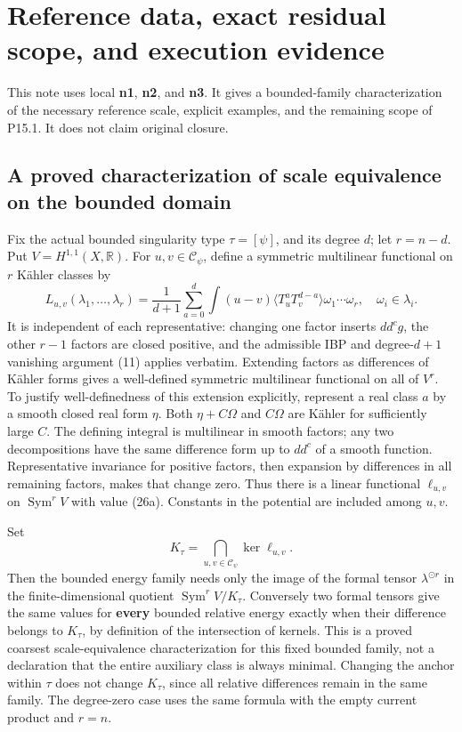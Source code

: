 \documentclass[
  11pt,
]{article}
\begin{document}
\section{Reference data, exact residual scope, and execution
evidence}\label{reference-data-exact-residual-scope-and-execution-evidence}

This note uses local \textbf{n1}, \textbf{n2}, and \textbf{n3}. It gives
a bounded-family characterization of the necessary reference scale,
explicit examples, and the remaining scope of P15.1. It does not claim
original closure.

\subsection{A proved characterization of scale equivalence on the
bounded
domain}\label{a-proved-characterization-of-scale-equivalence-on-the-bounded-domain}

Fix the actual bounded singularity type \(\tau=[\psi]\), and its degree
\(d\); let \(r=n-d\). Put \(V=H^{1,1}(X,\mathbb{R})\). For
\(u,v\in\mathcal{C}_\psi\), define a symmetric multilinear functional on
\(r\) Kähler classes by \[
L_{u,v}(\lambda_1,\ldots,\lambda_r)
=\frac1{d+1}\sum_{a=0}^d\int(u-v)
\langle T_u^aT_v^{d-a}\rangle\omega_1\cdots\omega_r,
\quad\omega_i\in\lambda_i.
\tag{26a}
\] It is independent of each representative: changing one factor inserts
\(dd^cg\), the other \(r-1\) factors are closed positive, and the
admissible IBP and degree-\(d+1\) vanishing argument (11) applies
verbatim. Extending factors as differences of Kähler forms gives a
well-defined symmetric multilinear functional on all of \(V^r\). To
justify well-definedness of this extension explicitly, represent a real
class \(a\) by a smooth closed real form \(\eta\). Both \(\eta+C\Omega\)
and \(C\Omega\) are Kähler for sufficiently large \(C\). The defining
integral is multilinear in smooth factors; any two decompositions have
the same difference form up to \(dd^c\) of a smooth function.
Representative invariance for positive factors, then expansion by
differences in all remaining factors, makes that change zero. Thus there
is a linear functional \(\ell_{u,v}\) on \(\operatorname{Sym}^rV\) with
value (26a). Constants in the potential are included among \(u,v\).

Set \[
K_\tau=\bigcap_{u,v\in\mathcal{C}_\psi}\ker\ell_{u,v}.
\tag{27a}
\] Then the bounded energy family needs only the image of the formal
tensor \(\lambda^{\odot r}\) in the finite-dimensional quotient
\(\operatorname{Sym}^rV/K_\tau\). Conversely two formal tensors give the
same values for \textbf{every} bounded relative energy exactly when
their difference belongs to \(K_\tau\), by definition of the
intersection of kernels. This is a proved coarsest scale-equivalence
characterization for this fixed bounded family, not a declaration that
the entire auxiliary class is always minimal. Changing the anchor within
\(\tau\) does not change \(K_\tau\), since all relative differences
remain in the same family. The degree-zero case uses the same formula
with the empty current product and \(r=n\).
\end{document}
